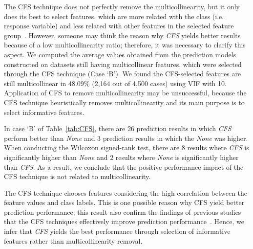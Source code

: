 The CFS technique does not perfectly remove the multicollinearity, but it only does its best to select features, which are more related with the class (i.e. response variable) and less related with other features in the selected feature group~\cite{Hall99correlation-basedfeature}. However, someone may think the reason why \emph{CFS} yields better results because of a low multicollinearity ratio; therefore, it was necessary to clarify this aspect. We computed the average values obtained from the prediction models constructed on datasets still having multicollinear features, which were selected through the CFS technique (Case `B'). We found the CFS-selected features are still multicollinear in 48.09\% (2,164 out of 4,500 cases) using VIF with 10.  Application of CFS to remove multicollinearity may be unsuccessful, because the CFS technique heuristically removes multicollinearity and its main purpose is to select informative features.

In case `B' of Table~\ref{tab:CFS}, there are 26 prediction results in which \emph{CFS} perform better than \emph{None} and 3 prediction results in which the \emph{None} was higher. When conducting the Wilcoxon signed-rank test, there are 8 results where \emph{CFS} is significantly higher than \emph{None} and 2 results where \emph{None} is significantly higher than \emph{CFS}. As a result, we conclude that the positive performance impact of the CFS technique is not related to multicollinearity. 

The CFS technique chooses features considering the high correlation between the feature values and class labels. This is one possible reason why CFS yield better prediction performance; this result also confirm the findings of previous studies that the CFS techniques effectively improve prediction performance~\cite{ghotra2017msr}.
Hence, we infer that \emph{CFS} yields the best performance through selection of informative features rather than multicollinearity removal.

